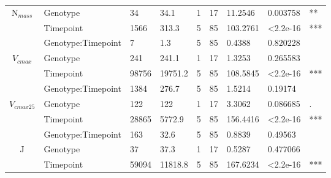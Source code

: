 \documentclass{article}
\begin{document}
\begin{table}[ht]
\begin{adjustbox}
\begin{tabular}{@{}cllllllll@{}}
			\midrule \multirow{3}{*}{N$_{mass}$}              & Genotype           & 34              & 34.1             & 1              & 17             & 11.2546          & 0.003758                     & **  \\
			                                                  & Timepoint          & 1566            & 313.3            & 5              & 85             & 103.2761         & \textless 2.2e-16            & *** \\
			                                                  & Genotype:Timepoint & 7               & 1.3              & 5              & 85             & 0.4388           & 0.820228                     &     \\
			\midrule \multirow{3}{*}{$V_{cmax}$}              & Genotype           & 241             & 241.1            & 1              & 17             & 1.3253           & 0.265583                     &     \\
			                                                  & Timepoint          & 98756           & 19751.2          & 5              & 85             & 108.5845         & \textless 2.2e-16            & *** \\
			                                                  & Genotype:Timepoint & 1384            & 276.7            & 5              & 85             & 1.5214           & 0.19174                      &     \\
			\midrule \multirow{3}{*}{$V_{cmax25}$}            & Genotype           & 122             & 122              & 1              & 17             & 3.3062           & 0.086685                     & .   \\
			                                                  & Timepoint          & 28865           & 5772.9           & 5              & 85             & 156.4416         & \textless 2.2e-16            & *** \\
			                                                  & Genotype:Timepoint & 163             & 32.6             & 5              & 85             & 0.8839           & 0.49563                      &     \\
			\midrule \multirow{3}{*}{J}                       & Genotype           & 37              & 37.3             & 1              & 17             & 0.5287           & 0.477066                     &     \\
			                                                  & Timepoint          & 59094           & 11818.8          & 5              & 85             & 167.6234         & \textless 2.2e-16            & *** \\

\end{tabular}
\end{adjustbox}
\end{table}
\end{document}
